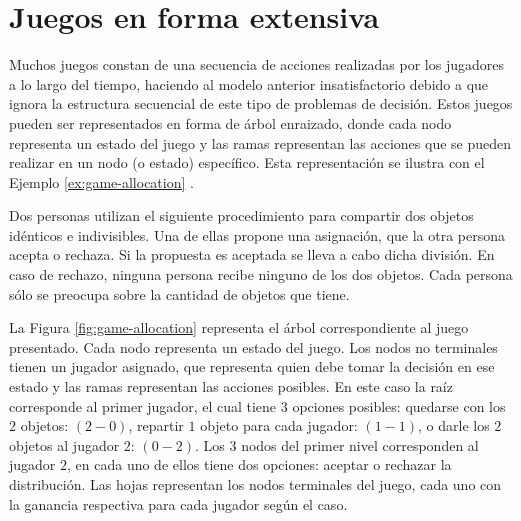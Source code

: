 \section{Juegos en forma extensiva}

Muchos juegos constan de una secuencia de acciones realizadas por los jugadores a lo largo del tiempo, haciendo al modelo anterior insatisfactorio debido a que ignora la estructura secuencial de este tipo de problemas de decisión. Estos juegos pueden ser representados en forma de árbol enraizado, donde cada nodo representa un estado del juego y las ramas representan las acciones que se pueden realizar en un nodo (o estado) específico. Esta representación se ilustra con el Ejemplo \ref{ex:game-allocation} \cite[p. 91]{bib:course-game-theory}.

\begin{example}
\label{ex:game-allocation} Dos personas utilizan el siguiente procedimiento para compartir dos objetos idénticos e indivisibles. Una de ellas propone una asignación, que la otra persona acepta o rechaza. Si la propuesta es aceptada se lleva a cabo dicha división. En caso de rechazo, ninguna persona recibe ninguno de los dos objetos. Cada persona sólo se preocupa sobre la cantidad de objetos que tiene. 
\end{example}

La Figura \ref{fig:game-allocation} representa el árbol correspondiente al juego presentado. Cada nodo representa un estado del juego. Los nodos no terminales tienen un jugador asignado, que representa quien debe tomar la decisión en ese estado y las ramas representan las acciones posibles. En este caso la raíz corresponde al primer jugador, el cual tiene $3$ opciones posibles: quedarse con los $2$ objetos: $(2-0)$, repartir $1$ objeto para cada jugador: $(1-1)$, o darle los $2$ objetos al jugador $2$: $(0-2)$. Los $3$ nodos del primer nivel corresponden al jugador $2$, en cada uno de ellos tiene dos opciones: aceptar o rechazar la distribución. Las hojas representan los nodos terminales del juego, cada uno con la ganancia respectiva para cada jugador según el caso.

